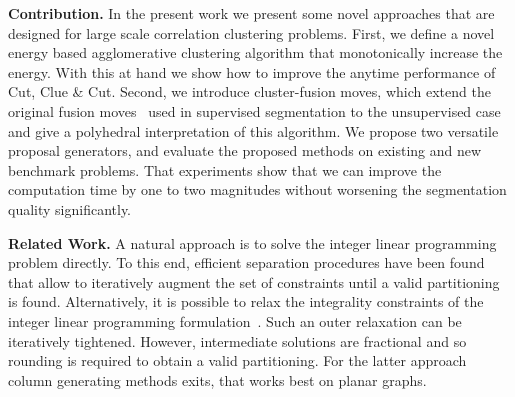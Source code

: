 \vspace{0.1cm}
\noindent \textbf{Contribution.}
In the present work we present some novel approaches that are designed for large scale correlation clustering problems.
First, we define a novel energy based agglomerative clustering algorithm that monotonically increase the energy.
With this at hand we show how to improve the anytime performance of Cut, Clue \& Cut.
Second, we introduce cluster-fusion moves, which extend the original fusion moves~\cite{Lempitsky-2010} 
used in supervised segmentation to the unsupervised case and give a polyhedral interpretation of this algorithm.
We propose two versatile proposal generators, and evaluate the proposed methods on existing and new benchmark problems.
That experiments show that we can improve the computation time by one to two magnitudes without worsening the segmentation 
quality significantly.
 
\vspace{0.1cm}
\noindent \textbf{Related Work.}
A natural approach is to solve the integer linear programming problem directly. 
To this end, efficient separation procedures have been found~\cite{kappes_2011_emmcvpr,kappes_2013_arxiv} that allow to iteratively augment the set of constraints until a valid partitioning is found. 
Alternatively, it is possible to relax the integrality constraints of the integer linear programming formulation~\cite{kappes_2013_arxiv}. 
Such an outer relaxation can be iteratively tightened. However, intermediate solutions are fractional and so rounding is required to obtain a valid partitioning.
For the latter approach column generating methods exits, that works best on planar \cite{yarkony_2012_eccv} graphs. %

